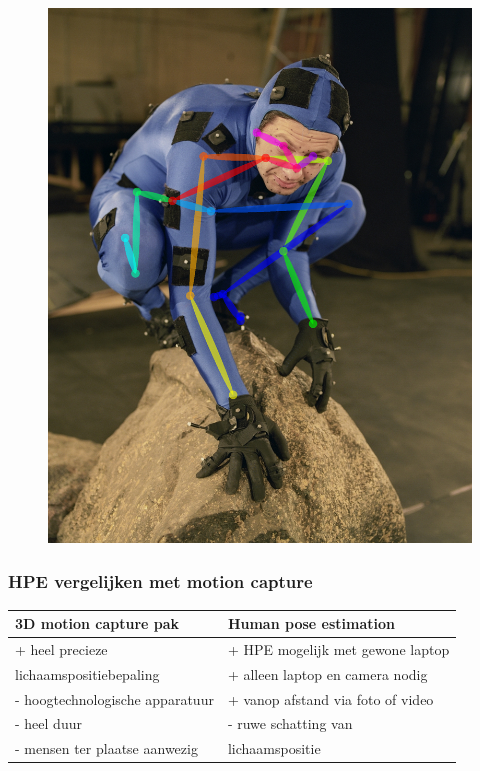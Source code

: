 \documentclass
   [kulak] %
   {kulakbeamer}
\begin{document}
\begin{frame}
\begin{figure}
\begin{minipage}[b]{.4\linewidth}
			\centering\includegraphics[width= \textwidth]{motion_capture_openpose}
			\label{fig:1b}
		\end{minipage}
	\end{figure}
\end{frame}

\begin{frame}
\frametitle{HPE vergelijken met motion capture}
\begin{center}
	\begin{tabular}{l|l} 
		\textbf{3D motion capture pak} & \textbf{Human pose estimation}\\
		\hline
		+ heel precieze & + HPE mogelijk met gewone laptop\\
		lichaamspositiebepaling &  + alleen laptop en camera nodig\\
		- hoogtechnologische apparatuur & + vanop afstand via foto of video\\
		- heel duur  &  - ruwe schatting van \\
		- mensen ter plaatse aanwezig & lichaamspositie\\
		
	\end{tabular}
\end{center}
\end{frame}
\end{document}
